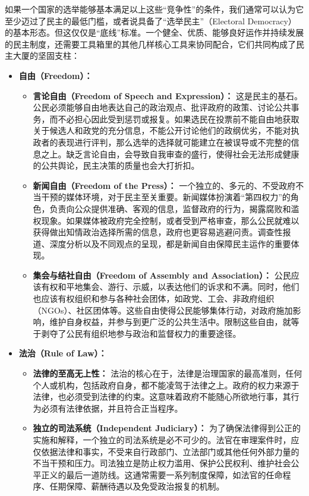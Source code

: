\documentclass[UTF8, 10pt]{ctexbook}
\begin{document}
如果一个国家的选举能够基本满足以上这些“竞争性”的条件，我们通常可以认为它至少迈过了民主的最低门槛，或者说具备了“选举民主”（Electoral Democracy）的基本形态。但这仅仅是“底线”标准。一个健全、优质、能够良好运作并持续发展的民主制度，还需要工具箱里的其他几样核心工具来协同配合，它们共同构成了民主大厦的坚固支柱：
\begin{itemize}
    \item \textbf{自由（Freedom）：}
    \begin{itemize}
        \item \textbf{言论自由（Freedom of Speech and Expression）：} 这是民主的基石。公民必须能够自由地表达自己的政治观点、批评政府的政策、讨论公共事务，而不必担心因此受到惩罚或报复。如果选民在投票前不能自由地获取关于候选人和政党的充分信息，不能公开讨论他们的政纲优劣，不能对执政者的表现进行评判，那么选举的选择就可能建立在被误导或不完整的信息之上。缺乏言论自由，会导致自我审查的盛行，使得社会无法形成健康的公共舆论，民主决策的质量也会大打折扣。
        \item \textbf{新闻自由（Freedom of the Press）：} 一个独立的、多元的、不受政府不当干预的媒体环境，对于民主至关重要。新闻媒体扮演着“第四权力”的角色，负责向公众提供准确、客观的信息，监督政府的行为，揭露腐败和滥权现象。如果媒体被政府完全控制，或者受到严格审查，那么公民就难以获得做出知情政治选择所需的信息，政府也更容易逃避问责。调查性报道、深度分析以及不同观点的呈现，都是新闻自由保障民主运作的重要体现。
        \item \textbf{集会与结社自由（Freedom of Assembly and Association）：} 公民应该有权和平地集会、游行、示威，以表达他们的诉求和不满。同时，他们也应该有权组织和参与各种社会团体，如政党、工会、非政府组织（NGOs）、社区团体等。这些自由使得公民能够集体行动，对政府施加影响，维护自身权益，并参与到更广泛的公共生活中。限制这些自由，就等于剥夺了公民有组织地参与政治和监督权力的重要途径。
    \end{itemize}
    \item \textbf{法治（Rule of Law）：}
    \begin{itemize}
        \item \textbf{法律的至高无上性：} 法治的核心在于，法律是治理国家的最高准则，任何个人或机构，包括政府自身，都不能凌驾于法律之上。政府的权力来源于法律，也必须受到法律的约束。这意味着政府不能随心所欲地行事，其行为必须有法律依据，并且符合正当程序。
        \item \textbf{独立的司法系统（Independent Judiciary）：} 为了确保法律得到公正的实施和解释，一个独立的司法系统是必不可少的。法官在审理案件时，应仅依据法律和事实，不受来自行政部门、立法部门或其他任何外部力量的不当干预和压力。司法独立是防止权力滥用、保护公民权利、维护社会公平正义的最后一道防线。这通常需要一系列制度保障，如法官的任命程序、任期保障、薪酬待遇以及免受政治报复的机制。

\end{itemize}
\end{itemize}
\end{document}
